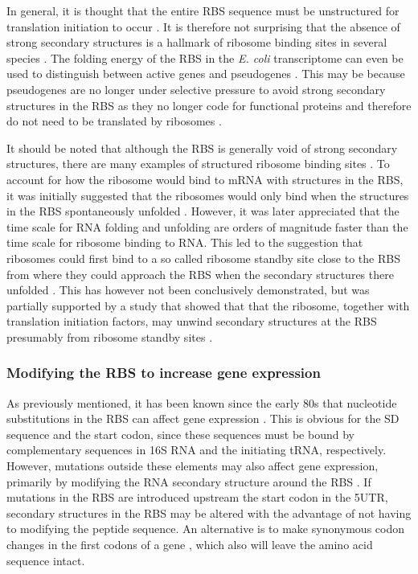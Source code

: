 In general, it is thought that the entire RBS sequence must be unstructured for
translation initiation to occur \cite{seo_quantitative_2009}. It is therefore
not surprising that the absence of strong secondary structures is a hallmark of
ribosome binding sites in several species \cite{gu_universal_2010}. The folding
energy of the RBS in the \textit{E. coli} transcriptome can even be used to
distinguish between active genes and pseudogenes \cite{keller_reduced_2012}.
This may be because pseudogenes are no longer under selective pressure
to avoid strong secondary structures in the RBS as they no longer code for
functional proteins and therefore do not need to be translated by ribosomes
\cite{keller_reduced_2012}.

It should be noted that although the RBS is generally void of strong secondary
structures, there are many examples of structured ribosome binding sites
\cite{studer_unfolding_2006}. To account for how the ribosome would bind to
mRNA with structures in the RBS, it was initially suggested that the ribosomes
would only bind when the structures in the RBS spontaneously unfolded
\cite{de_smit_translational_1994}. However, it was later appreciated that the
time scale for RNA folding and unfolding are orders of magnitude faster than
the time scale for ribosome binding to RNA. This led to the suggestion that
ribosomes could first bind to a so called ribosome standby site close to the
RBS from where they could approach the RBS when the secondary structures there
unfolded \cite{de_smit_translational_2003}. This has however not been
conclusively demonstrated, but was partially supported by a study that showed
that that the ribosome, together with translation initiation factors, may
unwind secondary structures at the RBS presumably from ribosome standby sites
\cite{studer_unfolding_2006}.

\subsubsection{Modifying the RBS to increase gene expression}
As previously mentioned, it has been known since the early 80s that nucleotide
substitutions in the RBS can affect gene expression
\cite{warburton_increased_1983}. This is obvious for the SD sequence and the
start codon, since these sequences must be bound by complementary sequences in
16S RNA and the initiating tRNA, respectively.  However, mutations outside
these elements may also affect gene expression, primarily by modifying the RNA
secondary structure around the RBS \cite{park_design_2007,
care_translation_2007}. If mutations in the RBS are introduced upstream the start
codon in the 5\ppp UTR, secondary structures in the RBS may be altered with the
advantage of not having to modifying the peptide sequence. An alternative is to
make synonymous codon changes in the first codons of a gene
\cite{cebe_rapid_2006}, which also will leave the amino acid sequence intact.

